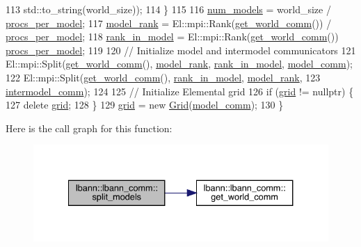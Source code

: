 \begin{DoxyCode}
113       std::to\_string(world\_size));
114   \}
115 
116   \hyperlink{classlbann_1_1lbann__comm_a256ff5a0bafb33f43784ffc8dd2d29cf}{num\_models} = world\_size / \hyperlink{classlbann_1_1lbann__comm_a7cb55d127259d7ed9f07ccde6f4ebd8c}{procs\_per\_model};
117   \hyperlink{classlbann_1_1lbann__comm_a1f3f90a996dbba4cd1cca60596933ea3}{model\_rank} = El::mpi::Rank(\hyperlink{classlbann_1_1lbann__comm_a0493f1f0c42b95674daacf5288fdb073}{get\_world\_comm}()) / 
      \hyperlink{classlbann_1_1lbann__comm_a7cb55d127259d7ed9f07ccde6f4ebd8c}{procs\_per\_model};
118   \hyperlink{classlbann_1_1lbann__comm_a0dcccd57c2b591eb7682e192e0a09033}{rank\_in\_model} = El::mpi::Rank(\hyperlink{classlbann_1_1lbann__comm_a0493f1f0c42b95674daacf5288fdb073}{get\_world\_comm}()) %
      \hyperlink{classlbann_1_1lbann__comm_a7cb55d127259d7ed9f07ccde6f4ebd8c}{procs\_per\_model};
119 
120   \textcolor{comment}{// Initialize model and intermodel communicators}
121   El::mpi::Split(\hyperlink{classlbann_1_1lbann__comm_a0493f1f0c42b95674daacf5288fdb073}{get\_world\_comm}(), \hyperlink{classlbann_1_1lbann__comm_a1f3f90a996dbba4cd1cca60596933ea3}{model\_rank}, 
      \hyperlink{classlbann_1_1lbann__comm_a0dcccd57c2b591eb7682e192e0a09033}{rank\_in\_model}, \hyperlink{classlbann_1_1lbann__comm_a58a75b76bd61ec8a26c1cbbec3dc2f45}{model\_comm});
122   El::mpi::Split(\hyperlink{classlbann_1_1lbann__comm_a0493f1f0c42b95674daacf5288fdb073}{get\_world\_comm}(), \hyperlink{classlbann_1_1lbann__comm_a0dcccd57c2b591eb7682e192e0a09033}{rank\_in\_model}, 
      \hyperlink{classlbann_1_1lbann__comm_a1f3f90a996dbba4cd1cca60596933ea3}{model\_rank},
123                  \hyperlink{classlbann_1_1lbann__comm_a2c51c5d8faf4f0ab4f43b892c55e597b}{intermodel\_comm});
124 
125   \textcolor{comment}{// Initialize Elemental grid}
126   \textcolor{keywordflow}{if} (\hyperlink{classlbann_1_1lbann__comm_a29fb31be115db3225b145f250a7778d9}{grid} != \textcolor{keyword}{nullptr}) \{
127     \textcolor{keyword}{delete} \hyperlink{classlbann_1_1lbann__comm_a29fb31be115db3225b145f250a7778d9}{grid};
128   \}
129   \hyperlink{classlbann_1_1lbann__comm_a29fb31be115db3225b145f250a7778d9}{grid} = \textcolor{keyword}{new} \hyperlink{base_8hpp_a9951bb1719d534e0401b1f06cad19eab}{Grid}(\hyperlink{classlbann_1_1lbann__comm_a58a75b76bd61ec8a26c1cbbec3dc2f45}{model\_comm});
130 \}
\end{DoxyCode}
Here is the call graph for this function\+:\nopagebreak
\begin{figure}[H]
\begin{center}
\leavevmode
\includegraphics[width=334pt]{classlbann_1_1lbann__comm_a0ae02c4083623d2e1381336a73fdb379_cgraph}
\end{center}
\end{figure}
